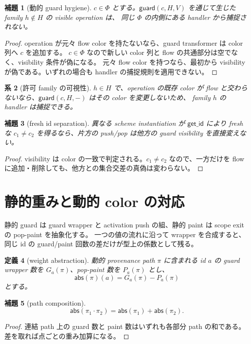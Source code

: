 \documentclass[uplatex,dvipdfmx,a4paper,11pt]{jsarticle}
\theoremstyle{jpplain}
\newtheorem{definition}{定義}[section]
\newtheorem{lemma}[definition]{補題}
\newtheorem{corollary}[definition]{系}
\newcommand{\flow}{\Phi}
\newcommand{\getid}{\mathsf{get\_id}}
\newcommand{\guard}{\mathsf{guard}}
\begin{document}
\begin{lemma}[動的 guard hygiene]
$c\in\flow$ とする。$\guard(c,H,V)$ を通じて生じた family $h\notin H$ の visible operation は、
同じ $\flow$ の内側にある handler から捕捉されない。
\end{lemma}
\begin{proof}
operation が元々 flow color を持たないなら、guard transformer は color 列へ $c$ を追加する。
$c\in\flow$ なので新しい color 列と flow の共通部分は空でなく、visibility 条件が偽になる。
元々 flow color を持つなら、最初から visibility が偽である。いずれの場合も handler の捕捉規則を適用できない。
\end{proof}

\begin{corollary}[許可 family の可視性]
$h\in H$ で、operation の既存 color が flow と交わらないなら、$\guard(c,H,-)$ はその color を変更しないため、
family $h$ の handler は捕捉できる。
\end{corollary}

\begin{lemma}[fresh id separation]
異なる scheme instantiation が $\getid$ により fresh な $c_1\neq c_2$ を得るなら、片方の push/pop は他方の guard visibility を直接変えない。
\end{lemma}
\begin{proof}
visibility は color の一致で判定される。$c_1\neq c_2$ なので、一方だけを flow に追加・削除しても、他方との集合交差の真偽は変わらない。
\end{proof}

\section{静的重みと動的 color の対応}

静的 guard は guard wrapper と activation push の組、静的 paint は scope exit の pop-paint を抽象化する。
一つの値の流れに沿って wrapper を合成すると、同じ id の guard/paint 回数の差だけが型上の係数として残る。

\begin{definition}[weight abstraction]
動的 provenance path $\pi$ に含まれる id $a$ の guard wrapper 数を $G_a(\pi)$、pop-paint 数を $P_a(\pi)$ とし、
\[
  \mathsf{abs}(\pi)(a)=G_a(\pi)-P_a(\pi)
\]
とする。
\end{definition}

\begin{lemma}[path composition]
\[
  \mathsf{abs}(\pi_1\cdot\pi_2)=\mathsf{abs}(\pi_1)+\mathsf{abs}(\pi_2).
\]
\end{lemma}
\begin{proof}
連結 path 上の guard 数と paint 数はいずれも各部分 path の和である。差を取れば点ごとの重み加算になる。
\end{proof}
\end{document}
